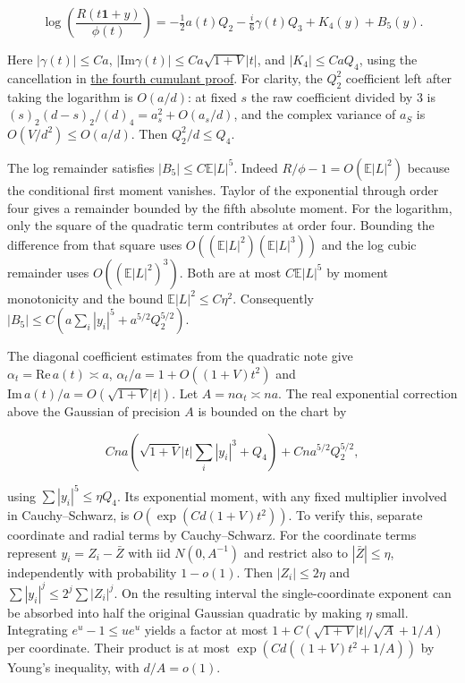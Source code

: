\begin{equation*}
\log\!\left(\frac{R(t\mathbf1+y)}{\phi(t)}\right)
=-\tfrac12a(t)Q_2-\tfrac i6\gamma(t)Q_3+K_4(y)+B_5(y).
\end{equation*}

Here $|\gamma(t)|\le Ca$, $|\mathrm{Im}\gamma(t)|\le Ca\sqrt{1+V}|t|$, and $|K_4|\le CaQ_4$, using the cancellation in \href{https://github.com/ProgramComputer/open-math-research/blob/605cc467a5be93a8408519da331e46f1008df96e/topics/balanced-arrays/critical-aspect/fourth-transverse-cumulant.md}{the fourth cumulant proof}. For clarity, the $Q_2^2$ coefficient left after taking the logarithm is $O(a/d)$: at fixed $s$ the raw coefficient divided by 3 is $(s)_2(d-s)_2/(d)_4=a_s^2+O(a_s/d)$, and the complex variance of $a_S$ is $O(V/d^2)\le O(a/d)$. Then $Q_2^2/d\le Q_4$.

The log remainder satisfies $|B_5|\le C\mathbb E|L|^5$. Indeed $R/\phi-1=O(\mathbb E|L|^2)$ because the conditional first moment vanishes. Taylor of the exponential through order four gives a remainder bounded by the fifth absolute moment. For the logarithm, only the square of the quadratic term contributes at order four. Bounding the difference from that square uses $O((\mathbb E|L|^2)(\mathbb E|L|^3))$ and the log cubic remainder uses $O((\mathbb E|L|^2)^3)$. Both are at most $C\mathbb E|L|^5$ by moment monotonicity and the bound $\mathbb E|L|^2\le C\eta^2$. Consequently $|B_5|\le C(a\sum_i|y_i|^5+a^{5/2}Q_2^{5/2})$.

The diagonal coefficient estimates from the quadratic note give $\alpha_t=\mathrm{Re}\,a(t)\asymp a$, $\alpha_t/a=1+O((1+V)t^2)$ and $\mathrm{Im}\,a(t)/a=O(\sqrt{1+V}|t|)$. Let $A=n\alpha_t\asymp na$. The real exponential correction above the Gaussian of precision $A$ is bounded on the chart by

\begin{equation*}
Cna\left(\sqrt{1+V}|t|\sum_i|y_i|^3+Q_4\right)
+Cna^{5/2}Q_2^{5/2},
\end{equation*}

using $\sum |y_i|^5\le\eta Q_4$. Its exponential moment, with any fixed multiplier involved in Cauchy--Schwarz, is $O(\exp(Cd(1+V)t^2))$. To verify this, separate coordinate and radial terms by Cauchy--Schwarz. For the coordinate terms represent $y_i=Z_i-\bar Z$ with iid $N(0,A^{-1})$ and restrict also to $|\bar Z|\le\eta$, independently with probability $1-o(1)$. Then $|Z_i|\le2\eta$ and $\sum |y_i|^j\le2^j\sum |Z_i|^j$. On the resulting interval the single-coordinate exponent can be absorbed into half the original Gaussian quadratic by making $\eta$ small. Integrating $e^u-1\le u e^u$ yields a factor at most $1+C(\sqrt{1+V}|t|/\sqrt A+1/A)$ per coordinate. Their product is at most $\exp(Cd((1+V)t^2+1/A))$ by Young's inequality, with $d/A=o(1)$.

